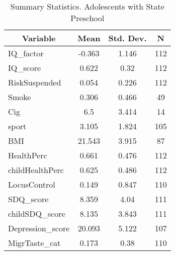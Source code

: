 
\begin{table}[htbp]\centering \caption{Summary Statistics. Adolescents with State Preschool \label{schoolAdolmaternaStat}}
\begin{tabular}{l c c  c}\hline\hline
\multicolumn{1}{c}{\textbf{Variable}} & \textbf{Mean}
 & \textbf{Std. Dev.} & \textbf{N}\\ \hline
IQ\_factor & -0.363 & 1.146  & 112\\
IQ\_score & 0.622 & 0.32  & 112\\
RiskSuspended & 0.054 & 0.226  & 112\\
Smoke & 0.306 & 0.466  & 49\\
Cig & 6.5 & 3.414  & 14\\
sport & 3.105 & 1.824  & 105\\
BMI & 21.543 & 3.915  & 87\\
HealthPerc & 0.661 & 0.476  & 112\\
childHealthPerc & 0.625 & 0.486  & 112\\
LocusControl & 0.149 & 0.847  & 110\\
SDQ\_score & 8.359 & 4.04  & 111\\
childSDQ\_score & 8.135 & 3.843  & 111\\
Depression\_score & 20.093 & 5.122  & 107\\
MigrTaste\_cat & 0.173 & 0.38  & 110\\
\hline\end{tabular}
\end{table}

